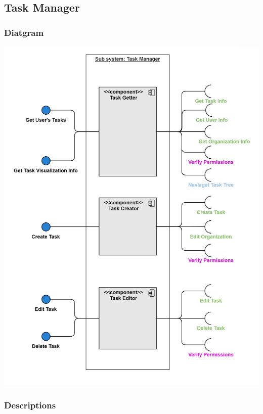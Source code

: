 \documentclass{article}
\begin{document}
\subsection{Task Manager}
\subsubsection{Diatgram}
\begin{center}
    \includegraphics[width=5.5in,keepaspectratio]{images/component_diagram/task_manager.jpg}
\end{center}
\subsubsection{Descriptions}
\end{document}
